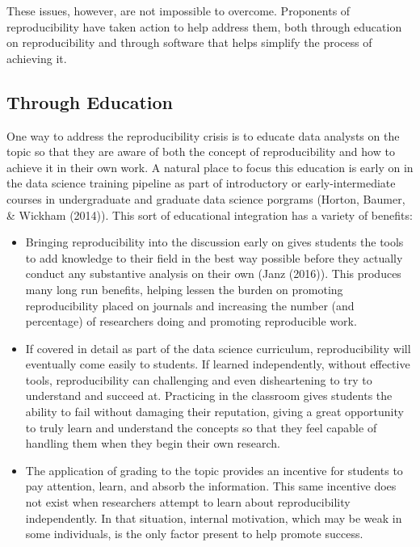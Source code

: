 \documentclass[12pt,twoside]{reedthesis}
\begin{document}
These issues, however, are not impossible to overcome. Proponents of reproducibility have taken action to help address them, both through education on reproducibility and through software that helps simplify the process of achieving it.

\hypertarget{through-education}{%
\subsection{Through Education}\label{through-education}}

One way to address the reproducibility crisis is to educate data analysts on the topic so that they are aware of both the concept of reproducibility and how to achieve it in their own work. A natural place to focus this education is early on in the data science training pipeline as part of introductory or early-intermediate courses in undergraduate and graduate data science porgrams (Horton, Baumer, \& Wickham (2014)). This sort of educational integration has a variety of benefits:
\begin{itemize}
\item
  Bringing reproducibility into the discussion early on gives students the tools to add knowledge to their field in the best way possible before they actually conduct any substantive analysis on their own (Janz (2016)). This produces many long run benefits, helping lessen the burden on promoting reproducibility placed on journals and increasing the number (and percentage) of researchers doing and promoting reproducible work.
\item
  If covered in detail as part of the data science curriculum, reproducibility will eventually come easily to students. If learned independently, without effective tools, reproducibility can challenging and even disheartening to try to understand and succeed at. Practicing in the classroom gives students the ability to fail without damaging their reputation, giving a great opportunity to truly learn and understand the concepts so that they feel capable of handling them when they begin their own research.
\item
  The application of grading to the topic provides an incentive for students to pay attention, learn, and absorb the information. This same incentive does not exist when researchers attempt to learn about reproducibility independently. In that situation, internal motivation, which may be weak in some individuals, is the only factor present to help promote success.
\end{itemize}
\end{document}
